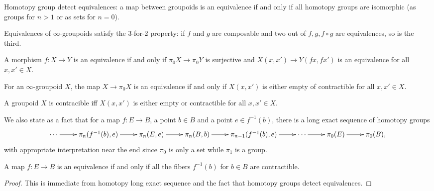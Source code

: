 Homotopy group detect equivalences:
a map between groupoids is an equivalence
if and only if all homotopy groups
are isomorphic (as groups for $n>1$ or
as sets for $n=0$).

\begin{lemma}
\label{lemma-equivalences-satisfy-2-for-3}
Equivalences of $\infty$-groupoids
satisfy the 3-for-2 property:
if  $f$ and $g$ are composable and two
out of $f,g,f \circ g$ are equivalences,
so is the third.
\end{lemma}

\begin{lemma}
\label{lemma-equivalence-iff-equivalence-on-path-spaces}
A morphism $f:X\to Y$ is an equivalence if and only if
$\pi_0 X \to \pi_0Y$ is surjective
and $X(x,x') \to Y(fx,fx')$ is an equivalence
for all $x,x' \in X$.
\end{lemma}

\begin{lemma}
\label{lemma-equivalence-iff-path-spaces-are-contractible}
For an  $\infty$-groupoid $X$,
the map $X \to \pi_0X$ is an equivalence if and only if
$X(x,x')$ is either empty of contractible for all $x,x' \in X$.
\end{lemma}

\begin{lemma}
\label{lemma-groupoid-is-contractible-iff-path-spaces-are-contractible}
A groupoid $X$ is contracible iff $X(x,x')$ is either empty or
contractible for all $x,x' \in X$.
\end{lemma}

\medskip\noindent
We also state as a fact that
for a map $f:E \to B$, a point $b \in B$ and a point $e \in f^{-1}(b)$,
there is a long exact sequence of homotopy groups
$$
\xymatrix{
\cdots\ar[r]&\pi_n(f^{-1}(b),e)\ar[r]&
\pi_n(E,e)\ar[r]&\pi_n(B,b)\ar[r]&
\pi_{n-1}(f^{-1}(b),e)\ar[r]&\cdots
\ar[r]&\pi_0(E)\ar[r]&\pi_0(B),
}
$$
with appropriate interpretation near the end since
$\pi_0$ is only a set while $\pi_1$ is a group.

\begin{proposition}
\label{proposition-map-is-equivalence-iff-fibers-contractible}
A map $f:E \to B$ is an equivalence if and only if
all the fibers $f^{-1}(b)$ for $b \in B$ are contractible.
\end{proposition}

\begin{proof}
This is immediate from homotopy long exact sequence
and the fact that homotopy groups detect equivalences.
\end{proof}

